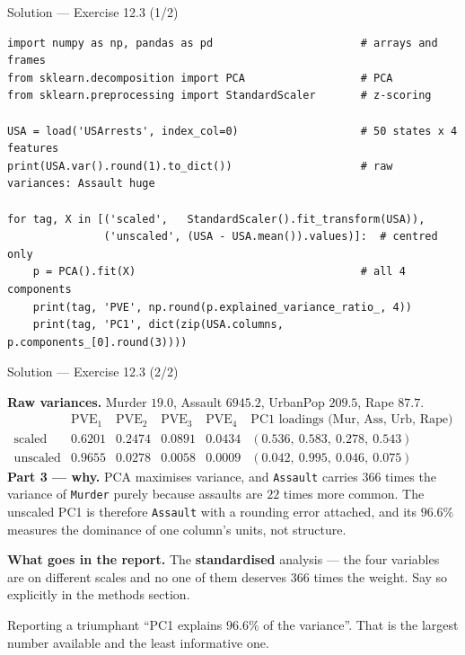 \documentclass[aspectratio=169,11pt]{beamer}
\begin{document}
\begin{frame}[fragile]{Solution --- Exercise 12.3 (1/2)}
\begin{solutionbox}
\begin{lstlisting}[basicstyle=\ttfamily\scriptsize]
import numpy as np, pandas as pd                       # arrays and frames
from sklearn.decomposition import PCA                  # PCA
from sklearn.preprocessing import StandardScaler       # z-scoring

USA = load('USArrests', index_col=0)                   # 50 states x 4 features
print(USA.var().round(1).to_dict())                    # raw variances: Assault huge

for tag, X in [('scaled',   StandardScaler().fit_transform(USA)),
               ('unscaled', (USA - USA.mean()).values)]:  # centred only
    p = PCA().fit(X)                                   # all 4 components
    print(tag, 'PVE', np.round(p.explained_variance_ratio_, 4))
    print(tag, 'PC1', dict(zip(USA.columns, p.components_[0].round(3))))
\end{lstlisting}
\end{solutionbox}
\end{frame}

\begin{frame}{Solution --- Exercise 12.3 (2/2)}
  \footnotesize
\begin{solutionbox}
  \textbf{Raw variances.} Murder $19.0$, Assault $6945.2$, UrbanPop $209.5$, Rape $87.7$.
  \[
    \begin{array}{l|cccc|l}
      & \mathrm{PVE}_1 & \mathrm{PVE}_2 & \mathrm{PVE}_3 & \mathrm{PVE}_4 & \text{PC1 loadings (Mur, Ass, Urb, Rape)}\\ \hline
      \text{scaled}   & 0.6201 & 0.2474 & 0.0891 & 0.0434 & (0.536,\ 0.583,\ 0.278,\ 0.543)\\
      \text{unscaled} & 0.9655 & 0.0278 & 0.0058 & 0.0009 & (0.042,\ 0.995,\ 0.046,\ 0.075)
    \end{array}
  \]
  \textbf{Part 3 --- why.} PCA maximises variance, and \texttt{Assault} carries $366$ times
  the variance of \texttt{Murder} purely because assaults are $22$ times more common. The
  unscaled PC1 is therefore \texttt{Assault} with a rounding error attached, and its
  $96.6\%$ measures the dominance of one column's units, not structure.

  \medskip
  \textbf{What goes in the report.} The \textbf{standardised} analysis --- the four
  variables are on different scales and no one of them deserves $366$ times the weight.
  Say so explicitly in the methods section.
\end{solutionbox}
\begin{mistake}
  Reporting a triumphant ``PC1 explains $96.6\%$ of the variance''. That is the largest
  number available and the least informative one.
\end{mistake}
\end{frame}
\end{document}

